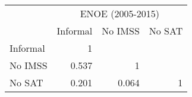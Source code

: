 \begin{tabular}{l|rrr}
\toprule
\multicolumn{1}{r}{} & \multicolumn{3}{c}{ENOE (2005-2015)} \\
\cmidrule{2-4}      & \multicolumn{1}{l}{Informal} & \multicolumn{1}{l}{No IMSS} & \multicolumn{1}{l}{No SAT} \\
\midrule
\midrule
Informal & 1     &       &  \\
No IMSS & 0.537 & 1     &  \\
No SAT & 0.201 & 0.064 & 1 \\
\bottomrule
\bottomrule
\end{tabular}%
